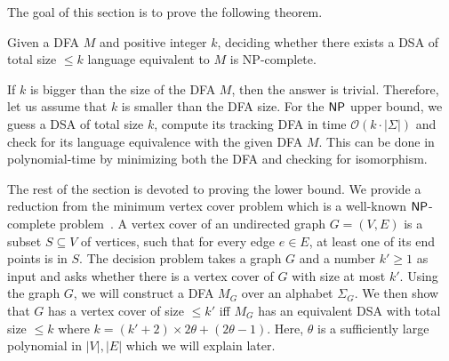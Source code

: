 The goal of this section is to prove the following theorem.

\begin{theorem}
  \label{thm:np-complete}
  Given a DFA $M$ and positive integer $k$, deciding whether there
  exists a DSA of total size $\le k$ language equivalent to $M$ is
  NP-complete.
\end{theorem}

If $k$ is bigger than the size of the DFA $M$, then the answer is
trivial. Therefore, let us assume that $k$ is smaller than the DFA
size. For the $\mathsf{NP}$ upper bound, we guess a DSA of total size $k$,
compute its tracking DFA in time $\mathcal{O}(k \cdot |\Sigma|)$ and
check for its language equivalence with the given DFA $M$. This can be
done in polynomial-time by minimizing both the DFA and checking for
isomorphism.

The rest of the section is devoted to proving the lower bound.  We
provide a reduction from the minimum vertex cover problem which is a
well-known $\mathsf{NP}$-complete problem~\cite{DBLP:conf/coco/Karp72}. A
vertex cover of an undirected graph $G = (V, E)$ is a subset
$S \subseteq V$ of vertices, such that for every edge $e \in E$, at
least one of its end points is in $S$. The decision problem takes a
graph $G$ and a number $k' \ge 1$ as input and asks whether there is a
vertex cover of $G$ with size at most $k'$. Using the graph $G$, we
will construct a DFA $M_G$ over an alphabet $\Sigma_G$. We then show
that $G$ has a vertex cover of size $\le k'$ iff $M_G$ has an
equivalent DSA with total size $\le k$ where
$k = (k'+2)\times 2\theta + (2 \theta - 1)$. Here, $\theta$ is a
sufficiently large polynomial in $|V|, |E|$ which we will explain
later. 

